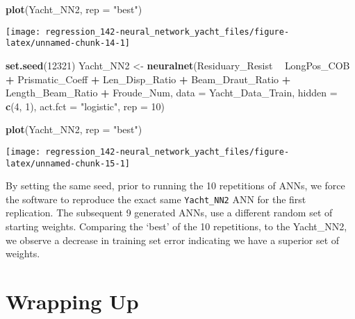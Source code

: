 \documentclass[]{book}
\newenvironment{Shaded}{\begin{snugshade}}{\end{snugshade}}
\newcommand{\DataTypeTok}[1]{\textcolor[rgb]{0.13,0.29,0.53}{#1}}
\newcommand{\DecValTok}[1]{\textcolor[rgb]{0.00,0.00,0.81}{#1}}
\newcommand{\KeywordTok}[1]{\textcolor[rgb]{0.13,0.29,0.53}{\textbf{#1}}}
\newcommand{\NormalTok}[1]{#1}
\newcommand{\OperatorTok}[1]{\textcolor[rgb]{0.81,0.36,0.00}{\textbf{#1}}}
\newcommand{\StringTok}[1]{\textcolor[rgb]{0.31,0.60,0.02}{#1}}
\begin{document}
\begin{Shaded}
\begin{Highlighting}[]
\KeywordTok{plot}\NormalTok{(Yacht_NN2, }\DataTypeTok{rep =} \StringTok{"best"}\NormalTok{)}
\end{Highlighting}
\end{Shaded}

\begin{center}\texttt{[image: regression\_142-neural\_network\_yacht\_files/figure-latex/unnamed-chunk-14-1]} \end{center}

\begin{Shaded}
\begin{Highlighting}[]
\KeywordTok{set.seed}\NormalTok{(}\DecValTok{12321}\NormalTok{)}
\NormalTok{Yacht_NN2 <-}\StringTok{ }\KeywordTok{neuralnet}\NormalTok{(Residuary_Resist }\OperatorTok{~}\StringTok{ }\NormalTok{LongPos_COB }\OperatorTok{+}\StringTok{ }\NormalTok{Prismatic_Coeff }\OperatorTok{+}\StringTok{ }\NormalTok{Len_Disp_Ratio }\OperatorTok{+}\StringTok{ }\NormalTok{Beam_Draut_Ratio }\OperatorTok{+}\StringTok{ }\NormalTok{Length_Beam_Ratio }\OperatorTok{+}\StringTok{ }\NormalTok{Froude_Num, }
                       \DataTypeTok{data =}\NormalTok{ Yacht_Data_Train, }
                       \DataTypeTok{hidden =} \KeywordTok{c}\NormalTok{(}\DecValTok{4}\NormalTok{, }\DecValTok{1}\NormalTok{), }
                       \DataTypeTok{act.fct =} \StringTok{"logistic"}\NormalTok{, }
                       \DataTypeTok{rep =} \DecValTok{10}\NormalTok{)}

\KeywordTok{plot}\NormalTok{(Yacht_NN2, }\DataTypeTok{rep =} \StringTok{"best"}\NormalTok{)}
\end{Highlighting}
\end{Shaded}

\begin{center}\texttt{[image: regression\_142-neural\_network\_yacht\_files/figure-latex/unnamed-chunk-15-1]} \end{center}

By setting the same seed, prior to running the 10 repetitions of ANNs, we force the software to reproduce the exact same \texttt{Yacht\_NN2} ANN for the first replication. The subsequent 9 generated ANNs, use a different random set of starting weights. Comparing the `best' of the 10 repetitions, to the Yacht\_NN2, we observe a decrease in training set error indicating we have a superior set of weights.

\hypertarget{wrapping-up}{%
\section{Wrapping Up}\label{wrapping-up}}
\end{document}
